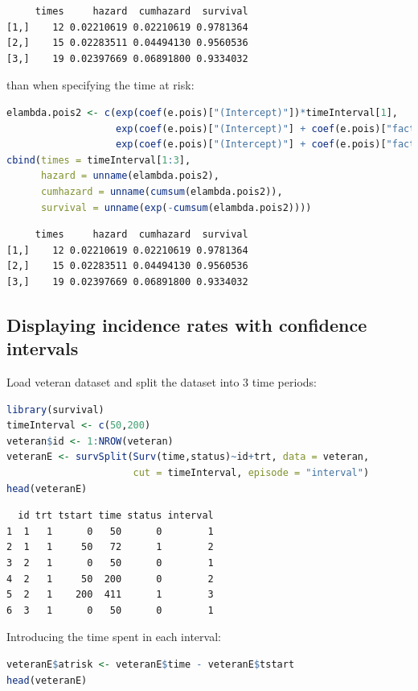\documentclass{article}
\begin{document}
\label{}
\begin{verbatim}
     times     hazard  cumhazard  survival
[1,]    12 0.02210619 0.02210619 0.9781364
[2,]    15 0.02283511 0.04494130 0.9560536
[3,]    19 0.02397669 0.06891800 0.9334032
\end{verbatim}


than when specifying the time at risk:
\begin{lstlisting}[language=r,numbers=none]
elambda.pois2 <- c(exp(coef(e.pois)["(Intercept)"])*timeInterval[1],
                   exp(coef(e.pois)["(Intercept)"] + coef(e.pois)["factor(interval)2"]) * diff(timeInterval)[1],
                   exp(coef(e.pois)["(Intercept)"] + coef(e.pois)["factor(interval)3"]) * diff(timeInterval)[2])
cbind(times = timeInterval[1:3],
      hazard = unname(elambda.pois2),
      cumhazard = unname(cumsum(elambda.pois2)),
      survival = unname(exp(-cumsum(elambda.pois2)))) 
\end{lstlisting}

\label{}
\begin{verbatim}
     times     hazard  cumhazard  survival
[1,]    12 0.02210619 0.02210619 0.9781364
[2,]    15 0.02283511 0.04494130 0.9560536
[3,]    19 0.02397669 0.06891800 0.9334032
\end{verbatim}
\subsection{Displaying incidence rates with confidence intervals}
\label{sec:orga6990d5}

Load veteran dataset and split the dataset into 3 time periods:
\begin{lstlisting}[language=r,numbers=none]
library(survival) 
timeInterval <- c(50,200)
veteran$id <- 1:NROW(veteran)
veteranE <- survSplit(Surv(time,status)~id+trt, data = veteran,
                      cut = timeInterval, episode = "interval")
head(veteranE)
\end{lstlisting}

\label{}
\begin{verbatim}
  id trt tstart time status interval
1  1   1      0   50      0        1
2  1   1     50   72      1        2
3  2   1      0   50      0        1
4  2   1     50  200      0        2
5  2   1    200  411      1        3
6  3   1      0   50      0        1
\end{verbatim}


Introducing the time spent in each interval:
\begin{lstlisting}[language=r,numbers=none]
veteranE$atrisk <- veteranE$time - veteranE$tstart
head(veteranE)
\end{lstlisting}
\end{document}
